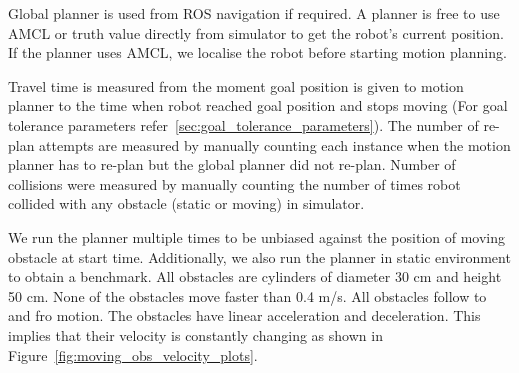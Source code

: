 Global planner\cite{globalPlanner} is used from ROS navigation\cite{rosnavigation} if required. 
A planner is free to use AMCL\cite{amcl} or truth value directly from simulator to get the
robot's current position. If the planner uses AMCL, we localise the robot before starting
motion planning.

Travel time is measured from the moment goal position is given to motion planner to the 
time when robot reached goal position and stops moving (For goal tolerance parameters refer~\ref{sec:goal_tolerance_parameters}).
The number of re-plan attempts are measured by manually counting each instance when the motion
planner has to re-plan but the global planner did not re-plan.
Number of collisions were measured by manually counting the number of times robot collided with any
obstacle (static or moving) in simulator.

We run the planner multiple times to be unbiased against the position of moving obstacle 
at start time.
Additionally, we also run the planner in static environment to obtain a benchmark.
All obstacles are cylinders of diameter 30 cm and height 50 cm. None of the obstacles move 
faster than 0.4 m/s. All obstacles follow to and fro motion. The obstacles have 
linear acceleration and deceleration. This implies that their velocity is constantly changing as shown
in Figure~\ref{fig:moving_obs_velocity_plots}.

\newpage{}
